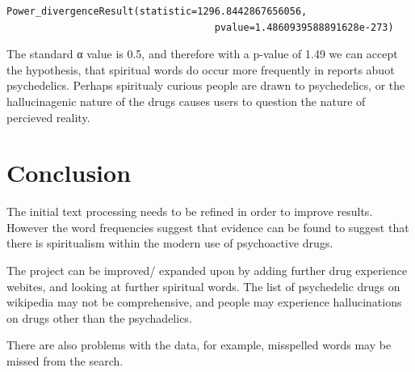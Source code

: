 \documentclass{article}
\begin{document}
\begin{lstlisting}
Power_divergenceResult(statistic=1296.8442867656056,
                                    pvalue=1.4860939588891628e-273)
\end{lstlisting}

The standard α value is 0.5, and therefore with a p-value of 1.49 we can accept the hypothesis, that spiritual words do occur more frequently in reports abuot psychedelics. Perhaps spiritualy curious people are drawn to psychedelics, or the hallucinagenic nature of the drugs causes users to question the nature of percieved reality. 

\section{Conclusion}

The initial text processing needs to be refined in order to improve results. However the word frequencies suggest that evidence can be found to suggest that there is spiritualism within the modern use of psychoactive drugs.

The project can be improved/ expanded upon by adding further drug experience webites, and looking at further spiritual words. The list of psychedelic drugs on wikipedia may not be comprehensive, and people may experience hallucinations on drugs other than the psychadelics. 

There are also problems with the data, for example, misspelled words may be missed from the search. 





\end{document}
